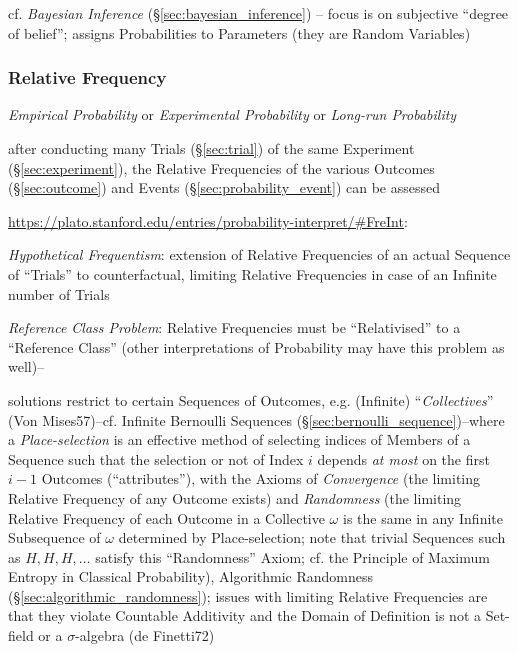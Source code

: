 cf. \emph{Bayesian Inference} (\S\ref{sec:bayesian_inference}) -- focus is on
subjective ``degree of belief''; assigns Probabilities to Parameters (they are
Random Variables)



\subsubsection{Relative Frequency}\label{sec:relative_frequency}

\emph{Empirical Probability} or \emph{Experimental Probability} or
\emph{Long-run Probability}

after conducting many Trials (\S\ref{sec:trial}) of the same Experiment
(\S\ref{sec:experiment}), the Relative Frequencies of the various Outcomes
(\S\ref{sec:outcome}) and Events (\S\ref{sec:probability_event}) can be assessed

\url{https://plato.stanford.edu/entries/probability-interpret/#FreInt}:

\emph{Hypothetical Frequentism}: extension of Relative Frequencies of an actual
Sequence of ``Trials'' to counterfactual, limiting Relative Frequencies in case
of an Infinite number of Trials

\emph{Reference Class Problem}: Relative Frequencies must be ``Relativised'' to
a ``Reference Class'' (other interpretations of Probability may have this
problem as well)--

solutions restrict to certain Sequences of Outcomes, e.g. (Infinite)
``\emph{Collectives}'' (Von Mises57)--cf. Infinite Bernoulli Sequences
(\S\ref{sec:bernoulli_sequence})--where a \emph{Place-selection} is an effective
method of selecting indices of Members of a Sequence such that the selection or
not of Index $i$ depends \emph{at most} on the first $i-1$ Outcomes
(``attributes''), with the Axioms of \emph{Convergence} (the limiting Relative
Frequency of any Outcome exists) and \emph{Randomness} (the limiting Relative
Frequency of each Outcome in a Collective $\omega$ is the same in any Infinite
Subsequence of $\omega$ determined by Place-selection; note that trivial
Sequences such as $H,H,H,\ldots$ satisfy this ``Randomness'' Axiom; cf. the
Principle of Maximum Entropy in Classical Probability), Algorithmic Randomness
(\S\ref{sec:algorithmic_randomness});
issues with limiting Relative Frequencies are that they violate Countable
Additivity and the Domain of Definition is not a Set-field or a $\sigma$-algebra
(de Finetti72)



